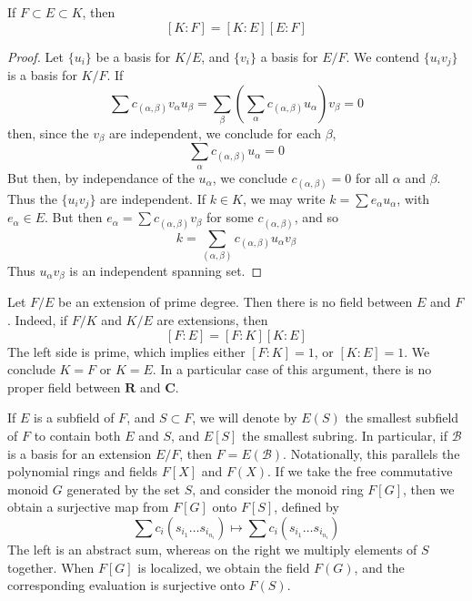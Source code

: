 \begin{theorem}
    If $F \subset E \subset K$, then
    \[ [K:F] = [K: E][E: F] \]
\end{theorem}
\begin{proof}
    Let $\{ u_i \}$ be a basis for $K/E$, and $\{ v_i \}$ a basis for $E/F$. We contend $\{ u_i v_j \}$ is a basis for $K/F$. If
    \[ \sum c_{(\alpha,\beta)} v_\alpha u_\beta = \sum_\beta \left( \sum_\alpha c_{(\alpha, \beta)} u_\alpha \right) v_\beta = 0 \]
    then, since the $v_\beta$ are independent, we conclude for each $\beta$,
    \[ \sum_\alpha c_{(\alpha, \beta)} u_\alpha = 0 \]
    But then, by independance of the $u_\alpha$, we conclude $c_{(\alpha, \beta)} = 0$ for all $\alpha$ and $\beta$. Thus the $\{ u_i v_j \}$ are independent. If $k \in K$, we may write $k = \sum e_\alpha u_\alpha$, with $e_\alpha \in E$. But then $e_\alpha = \sum c_{(\alpha, \beta)} v_\beta$ for some $c_{(\alpha, \beta)}$, and so
    \[ k = \sum_{(\alpha, \beta)} c_{(\alpha, \beta)} u_\alpha v_\beta \]
    Thus $u_\alpha v_\beta$ is an independent spanning set.
\end{proof}

\begin{example}
    Let $F/E$ be an extension of prime degree. Then there is no field between $E$ and $F$. Indeed, if $F/K$ and $K/E$ are extensions, then
    \[ [F:E] = [F:K][K:E] \]
    The left side is prime, which implies either $[F:K] = 1$, or $[K:E] = 1$. We conclude $K = F$ or $K = E$. In a particular case of this argument, there is no proper field between $\mathbf{R}$ and $\mathbf{C}$.
\end{example}

If $E$ is a subfield of $F$, and $S \subset F$, we will denote by $E(S)$ the smallest subfield of $F$ to contain both $E$ and $S$, and $E[S]$ the smallest subring. In particular, if $\mathcal{B}$ is a basis for an extension $E/F$, then $F = E(\mathcal{B})$. Notationally, this parallels the polynomial rings and fields $F[X]$ and $F(X)$. If we take the free commutative monoid $G$ generated by the set $S$, and consider the monoid ring $F[G]$, then we obtain a surjective map from $F[G]$ onto $F[S]$, defined by
%
\[ \sum c_i (s_{i_1} \dots s_{i_{n_i}}) \mapsto \sum c_i (s_{i_1} \dots s_{i_{n_i}}) \]
%
The left is an abstract sum, whereas on the right we multiply elements of $S$ together. When $F[G]$ is localized, we obtain the field $F(G)$, and the corresponding evaluation is surjective onto $F(S)$.

